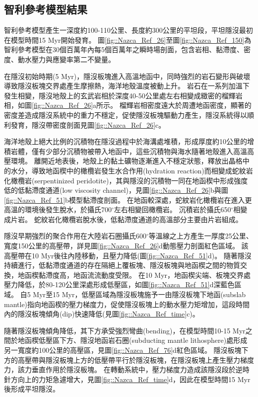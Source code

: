 \subsection{智利參考模型結果}\label{智利參考模型結果}
智利參考模型產生一深度約100-110公里、長度約300公里的平坦段，平坦隱沒最初在模型時間15 Myr開始發育。
圖\ref{fig::Nazca_Ref_26}至圖\ref{fig::Nazca_Ref_150}為智利參考模型在30個百萬年內每5個百萬年之瞬時場剖面，包含岩相、黏滯度、密度、動水壓力與應變率第二不變量。

在隱沒初始時期(5 Myr)，隱沒板塊進入高溫地函中，同時強烈的岩石變形與破壞導致隱沒板塊交界處產生摩擦熱，海洋地殼溫度被動上升。
岩石在一系列加溫下發生相變，隱沒地殼上的玄武岩相於深度40-50公里處左右相變成緻密的榴輝岩相，如圖\ref{fig::Nazca_Ref_26}a所示。
榴輝岩相密度遠大於周遭地函密度，顯著的密度差造成隱沒系統中的重力不穩定，促使隱沒板塊驅動力產生，隱沒系統得以順利發育，隱沒帶密度剖面見圖\ref{fig::Nazca_Ref_26}c。

海洋地殼上絕大比例的沉積物在隱沒過程中於海溝處堆積，形成厚度約10公里的增積岩體，僅有少部分沉積物被帶入地函中，這些沉積物與海水隨著地殼進入高溫高壓環境。
離開近地表後，地殼上的黏土礦物逐漸進入不穩定狀態，釋放出晶格中的水分，導致地函楔中的橄欖岩發生水合作用(hydration reaction)而相變成蛇紋岩化橄欖岩(serpentinized peridotite)，其與隱沒的沉積物一同在地函楔中形成強度低的低黏滯度通道(low viscosity channel)，見圖\ref{fig::Nazca_Ref_26}b與圖\ref{fig::Nazca_Ref_51}b模型黏滯度剖面。
在地函較深處，蛇紋岩化橄欖岩在進入更高溫的環境後發生脫水，於攝氏700$^{\circ}$左右相變回橄欖岩。
沉積岩於攝氏650$^{\circ}$相變成片岩。
蛇紋岩化橄欖岩脫水後，低黏滯度通道的高溫部分主要由片岩組成。

隱沒早期強烈的聚合作用在大陸岩石圈攝氏600$^{\circ}$等溫線之上方產生一厚度25公里、寬度150公里的高壓帶，詳見圖\ref{fig::Nazca_Ref_26}d動態壓力剖面紅色區域。
該高壓帶在10 Myr後往內陸移動，且壓力降低(圖\ref{fig::Nazca_Ref_51}d)。
隨著隱沒持續進行，低黏滯度通道的存在隔絕上覆板塊、隱沒板塊與地函楔之間的物質交換，地函楔黏滯度高，地函流流動度受限。
在10 Myr，地函楔尖端、板塊交界處壓力降低，於80-120公里深處形成低壓區，如圖\ref{fig::Nazca_Ref_51}d深藍色區域。 
自5 Myr至15 Myr，低壓區域為隱沒板塊施予一由隱沒板塊下地函(subslab mantle)指向地函楔的壓力梯度力，促使隱沒板塊上的動水壓力矩增加，這段時間內的隱沒板塊傾角(dip)快速降低(見圖\ref{fig::Nazca_Ref_time}c)。

隨著隱沒板塊傾角降低，其下方承受強烈彎曲(bending)，在模型時間10-15 Myr之間於地函楔低壓區下方、隱沒地函岩石圈(subducting mantle lithosphere)處形成另一寬度約100公里的高壓區，見圖\ref{fig::Nazca_Ref_76}d紅色區域。
隱沒板塊下方的高壓帶與隱沒板塊上方的低壓帶平行於隱沒板塊，在隱沒板塊上產生壓力梯度力，該力垂直作用於隱沒板塊。
在轉動系統中，壓力梯度力造成該隱沒段於逆時針方向上的力矩急遽增大，見圖\ref{fig::Nazca_Ref_time}d，因此在模型時間15 Myr後形成平坦隱沒。

